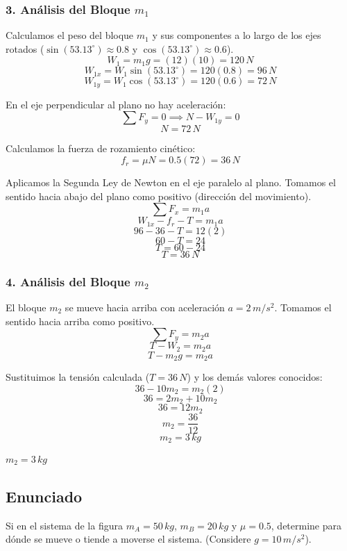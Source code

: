 \documentclass[12pt, a4paper]{article}
\begin{document}
\subsubsection*{3. Análisis del Bloque $m_1$}
Calculamos el peso del bloque $m_1$ y sus componentes a lo largo de los ejes rotados ($\sin(53.13^\circ) \approx 0.8$ y $\cos(53.13^\circ) \approx 0.6$).
$$ W_1 = m_1 g = (12)(10) = 120\,\si{N} $$
$$ W_{1x} = W_1 \sin(53.13^\circ) = 120(0.8) = 96\,\si{N} $$
$$ W_{1y} = W_1 \cos(53.13^\circ) = 120(0.6) = 72\,\si{N} $$

En el eje perpendicular al plano no hay aceleración:
$$ \sum F_y = 0 \implies N - W_{1y} = 0 $$
$$ N = 72\,\si{N} $$

Calculamos la fuerza de rozamiento cinético:
$$ f_r = \mu N = 0.5(72) = 36\,\si{N} $$

Aplicamos la Segunda Ley de Newton en el eje paralelo al plano. Tomamos el sentido hacia abajo del plano como positivo (dirección del movimiento).
$$ \sum F_x = m_1 a $$
$$ W_{1x} - f_r - T = m_1 a $$
$$ 96 - 36 - T = 12(2) $$
$$ 60 - T = 24 $$
$$ T = 60 - 24 $$
$$ T = 36\,\si{N} $$

\subsubsection*{4. Análisis del Bloque $m_2$}
El bloque $m_2$ se mueve hacia arriba con aceleración $a = 2\,\si{m/s^2}$. Tomamos el sentido hacia arriba como positivo.
$$ \sum F_y = m_2 a $$
$$ T - W_2 = m_2 a $$
$$ T - m_2 g = m_2 a $$

Sustituimos la tensión calculada ($T = 36\,\si{N}$) y los demás valores conocidos:
$$ 36 - 10 m_2 = m_2 (2) $$
$$ 36 = 2 m_2 + 10 m_2 $$
$$ 36 = 12 m_2 $$
$$ m_2 = \frac{36}{12} $$
$$ m_2 = 3\,\si{kg} $$

\begin{tcolorbox}[colback=green!5!white, colframe=green!50!black, title=Respuesta Final]
\centering \Large $m_2 = 3\,\si{kg}$
\end{tcolorbox}

\newpage

\subsection*{Enunciado}
Si en el sistema de la figura $m_A = 50\,\si{kg}$, $m_B = 20\,\si{kg}$ y $\mu = 0.5$, determine para dónde se mueve o tiende a moverse el sistema. (Considere $g = 10\,\si{m/s^2}$).
\end{document}
